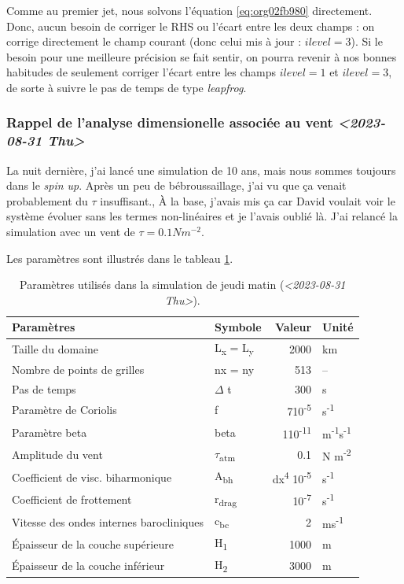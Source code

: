 \documentclass[10pt]{article}
\numberwithin{equation}{section}
\begin{document}
Comme au premier jet, nous solvons l'équation \ref{eq:org02fb980} directement.
Donc, aucun besoin de corriger le RHS ou l'écart entre les deux champs : on corrige directement le champ courant (donc celui mis à jour : \(ilevel=3\)).
Si le besoin pour une meilleure précision se fait sentir, on pourra revenir à nos bonnes habitudes de seulement corriger l'écart entre les champs \(ilevel=1\) et \(ilevel=3\), de sorte à suivre le pas de temps de type \emph{leapfrog}.

\subsubsection{Rappel de l'analyse dimensionelle associée au vent \textit{<2023-08-31 Thu>}}
\label{sec:org25a2467}
La nuit dernière, j'ai lancé une simulation de 10 ans, mais nous sommes toujours dans le \emph{spin up}.
Après un peu de bébroussaillage, j'ai vu que ça venait probablement du \(\tau\) insuffisant.,
À la base, j'avais mis ça car David voulait voir le système évoluer sans les termes non-linéaires et je l'avais oublié là.
J'ai relancé la simulation avec un vent de \(\tau = 0.1 Nm^{-2}\).\bigskip

Les paramètres sont illustrés dans le tableau \ref{tab:org631b0dc}.

\begin{table}[htbp]
\caption{\label{tab:org631b0dc}Paramètres utilisés dans la simulation de jeudi matin (\textit{<2023-08-31 Thu>}).}
\centering
\begin{tabular}{llrl}
\hline
\hline
Paramètres & Symbole & Valeur & Unité\\[0pt]
\hline
Taille du domaine & L\textsubscript{x} = L\textsubscript{y} & 2000 & km\\[0pt]
Nombre de points de grilles & nx = ny & 513 & --\\[0pt]
Pas de temps & \(\Delta\) t & 300 & s\\[0pt]
Paramètre de Coriolis & f & 7\texttimes{}10\textsuperscript{-5} & s\textsuperscript{-1}\\[0pt]
Paramètre beta & beta & 1\texttimes{}10\textsuperscript{-11} & m\textsuperscript{-1}s\textsuperscript{-1}\\[0pt]
Amplitude du vent & \(\tau\)\textsubscript{atm} & 0.1 & N m\textsuperscript{-2}\\[0pt]
Coefficient de visc. biharmonique & A\textsubscript{bh} & dx\textsuperscript{4} \texttimes{}10\textsuperscript{-5} & s\textsuperscript{-1}\\[0pt]
Coefficient de frottement & r\textsubscript{drag} & 10\textsuperscript{-7} & s\textsuperscript{-1}\\[0pt]
Vitesse des ondes internes barocliniques & c\textsubscript{bc} & 2 & ms\textsuperscript{-1}\\[0pt]
Épaisseur de la couche supérieure & H\textsubscript{1} & 1000 & m\\[0pt]
Épaisseur de la couche inférieur & H\textsubscript{2} & 3000 & m\\[0pt]
\hline
\end{tabular}
\end{table}
\end{document}
